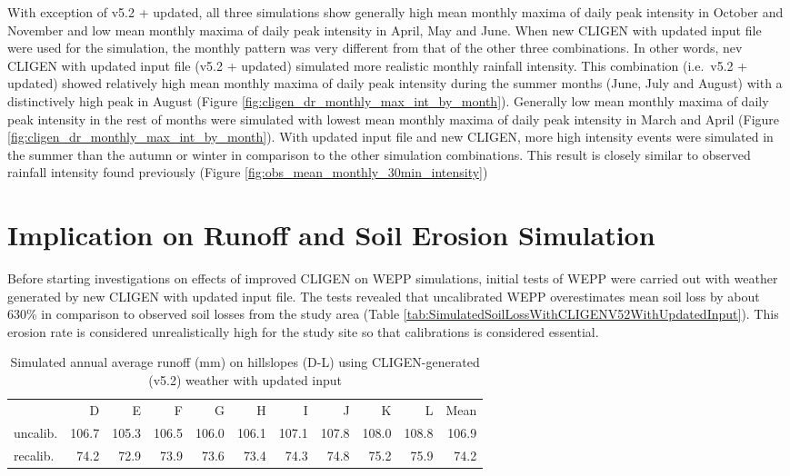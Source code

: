 With exception of v5.2 + updated, all three simulations show generally high mean
monthly maxima of daily peak intensity in October and November and low mean
monthly maxima of daily peak intensity in April, May and June. When new CLIGEN
with updated input file were used for the simulation, the monthly pattern was
very different from that of the other three combinations. In other words,
nev CLIGEN with updated input file (v5.2 + updated) simulated more realistic
monthly rainfall intensity.
This combination (i.e.\ v5.2 + updated) showed relatively high mean monthly
maxima of daily peak intensity during the summer months (June, July and August)
with a distinctively high peak in August (Figure
\ref{fig:cligen_dr_monthly_max_int_by_month}). Generally low mean monthly maxima
of daily peak intensity in the rest of months were simulated with lowest mean
monthly maxima of daily peak intensity in March and April (Figure
\ref{fig:cligen_dr_monthly_max_int_by_month}). With updated input file and new
CLIGEN, more high intensity events were simulated in the summer than the autumn
or winter in comparison to the other simulation combinations. This result is
closely similar to observed rainfall intensity found previously (Figure
\ref{fig:obs_mean_monthly_30min_intensity})

\section{Implication on Runoff and Soil Erosion Simulation}
\label{sec:RunoffAndSoilLossSimulation}
Before starting investigations on effects of improved CLIGEN on WEPP
simulations, initial tests of WEPP were carried out with weather generated by
new CLIGEN with updated input file. The tests revealed that uncalibrated WEPP
overestimates mean soil loss by about 630\% in comparison to observed soil
losses from the study area (Table
\ref{tab:SimulatedSoilLossWithCLIGENV52WithUpdatedInput}). This erosion rate is
considered unrealistically high for the study site so that calibrations is
considered essential.

\begin{table}[htbp]
  \centering
  \caption[Simulated annual average runoff on hillslopes using
CLIGEN-generated weather with updated input]{Simulated annual average runoff
(mm) on hillslopes (D-L) using CLIGEN-generated (v5.2) weather with updated
input}
  \label{tab:SimulatedRunoffWithCLIGENV52WithUpdatedInput}
  \small
    \begin{tabular}{lrrrrrrrrrr}
      \toprule
      & D & E & F & G & H & I & J & K & L & Mean\\
      \cmidrule{2-11}
      uncalib. & 106.7 & 105.3 & 106.5 & 106.0 & 106.1 & 107.1
& 107.8 & 108.0 & 108.8 & 106.9\\
      recalib. & 74.2 & 72.9 & 73.9 & 73.6 & 73.4 & 74.3 &
74.8 & 75.2 & 75.9 & 74.2\\
      \bottomrule
    \end{tabular}
\end{table}

